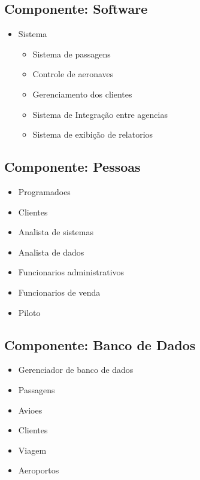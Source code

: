 \subsection{Componente: Software}
\begin{itemize}
       \item Sistema
             \begin{itemize}
                    \item Sistema de passagens
                    \item Controle de aeronaves
                    \item Gerenciamento dos clientes
                    \item Sistema de Integração entre agencias
                    \item Sistema de exibição de relatorios
             \end{itemize}
\end{itemize}



\subsection{Componente: Pessoas}
\begin{itemize}
       \item Programadoes
       \item Clientes
       \item Analista de sistemas
       \item Analista de dados
       \item Funcionarios administrativos
       \item Funcionarios de venda
       \item Piloto
\end{itemize}

\subsection{Componente: Banco de Dados}

\begin{itemize}
       \item Gerenciador de banco de dados
       \item Passagens
       \item Avioes
       \item Clientes
       \item Viagem
       \item Aeroportos
\end{itemize}

